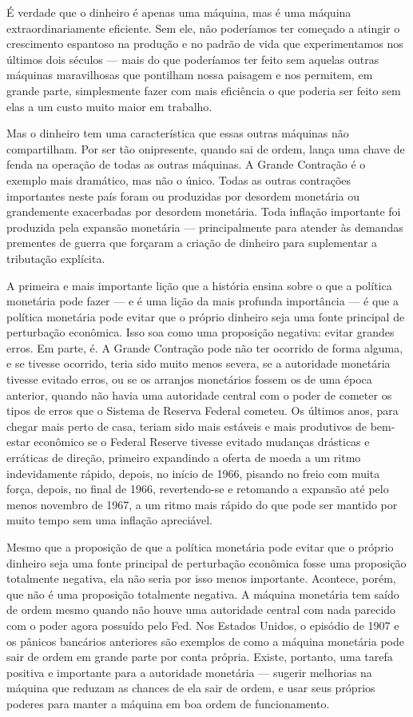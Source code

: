 \documentclass[12pt]{article}
\begin{document}
É verdade que o dinheiro é apenas uma máquina, mas é uma máquina extraordinariamente eficiente. Sem ele, não poderíamos ter começado a atingir o crescimento espantoso na produção e no padrão de vida que experimentamos nos últimos dois séculos — mais do que poderíamos ter feito sem aquelas outras máquinas maravilhosas que pontilham nossa paisagem e nos permitem, em grande parte, simplesmente fazer com mais eficiência o que poderia ser feito sem elas a um custo muito maior em trabalho.

Mas o dinheiro tem uma característica que essas outras máquinas não compartilham. Por ser tão onipresente, quando sai de ordem, lança uma chave de fenda na operação de todas as outras máquinas. A Grande Contração é o exemplo mais dramático, mas não o único. Todas as outras contrações importantes neste país foram ou produzidas por desordem monetária ou grandemente exacerbadas por desordem monetária. Toda inflação importante foi produzida pela expansão monetária — principalmente para atender às demandas prementes de guerra que forçaram a criação de dinheiro para suplementar a tributação explícita.

A primeira e mais importante lição que a história ensina sobre o que a política monetária pode fazer — e é uma lição da mais profunda importância — é que a política monetária pode evitar que o próprio dinheiro seja uma fonte principal de perturbação econômica. Isso soa como uma proposição negativa: evitar grandes erros. Em parte, é. A Grande Contração pode não ter ocorrido de forma alguma, e se tivesse ocorrido, teria sido muito menos severa, se a autoridade monetária tivesse evitado erros, ou se os arranjos monetários fossem os de uma época anterior, quando não havia uma autoridade central com o poder de cometer os tipos de erros que o Sistema de Reserva Federal cometeu. Os últimos anos, para chegar mais perto de casa, teriam sido mais estáveis e mais produtivos de bem-estar econômico se o Federal Reserve tivesse evitado mudanças drásticas e erráticas de direção, primeiro expandindo a oferta de moeda a um ritmo indevidamente rápido, depois, no início de 1966, pisando no freio com muita força, depois, no final de 1966, revertendo-se e retomando a expansão até pelo menos novembro de 1967, a um ritmo mais rápido do que pode ser mantido por muito tempo sem uma inflação apreciável.

Mesmo que a proposição de que a política monetária pode evitar que o próprio dinheiro seja uma fonte principal de perturbação econômica fosse uma proposição totalmente negativa, ela não seria por isso menos importante. Acontece, porém, que não é uma proposição totalmente negativa. A máquina monetária tem saído de ordem mesmo quando não houve uma autoridade central com nada parecido com o poder agora possuído pelo Fed. Nos Estados Unidos, o episódio de 1907 e os pânicos bancários anteriores são exemplos de como a máquina monetária pode sair de ordem em grande parte por conta própria. Existe, portanto, uma tarefa positiva e importante para a autoridade monetária — sugerir melhorias na máquina que reduzam as chances de ela sair de ordem, e usar seus próprios poderes para manter a máquina em boa ordem de funcionamento.
\end{document}
